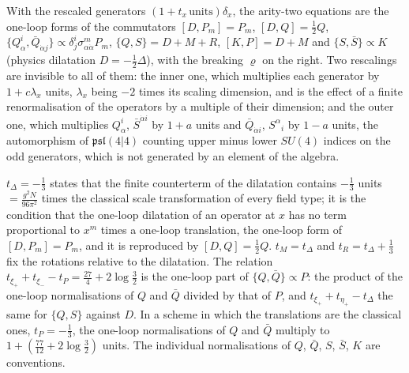 \begin{remark}
With the rescaled generators $(1+t_x\,\text{units})\delta_x$, the arity-two equations are the one-loop forms of the commutators $[D,P_m]=P_m$, $[D,Q]=\tfrac12Q$, $\{Q^i_\alpha,\bar Q_{\dot\alpha j}\}\propto\delta^i_j\sigma^m_{\alpha\dot\alpha}P_m$, $\{Q,S\}=D+M+R$, $[K,P]=D+M$ and $\{S,\bar S\}\propto K$ (physics dilatation $D=-\tfrac12\Delta$), with the breaking $\varrho$ on the right. Two rescalings are invisible to all of them: the inner one, which multiplies each generator by $1+c\lambda_x$ units, $\lambda_x$ being $-2$ times its scaling dimension, and is the effect of a finite renormalisation of the operators by a multiple of their dimension; and the outer one, which multiplies $Q^i_\alpha$, $\bar S^{\dot\alpha i}$ by $1+a$ units and $\bar Q_{\dot\alpha i}$, $S^\alpha{}_i$ by $1-a$ units, the automorphism of $\mathfrak{psl}(4|4)$ counting upper minus lower $SU(4)$ indices on the odd generators, which is not generated by an element of the algebra.
\end{remark}

\begin{remark}
$t_\Delta=-\tfrac13$ states that the finite counterterm of the dilatation contains $-\tfrac13$ units $=\tfrac{g^2N}{96\pi^2}$ times the classical scale transformation of every field type; it is the condition that the one-loop dilatation of an operator at $x$ has no term proportional to $x^m$ times a one-loop translation, the one-loop form of $[D,P_m]=P_m$, and it is reproduced by $[D,Q]=\tfrac12Q$. $t_M=t_\Delta$ and $t_R=t_\Delta+\tfrac13$ fix the rotations relative to the dilatation. The relation $t_{\xi_+}+t_{\xi_-}-t_P=\tfrac{27}4+2\log\tfrac32$ is the one-loop part of $\{Q,\bar Q\}\propto P$: the product of the one-loop normalisations of $Q$ and $\bar Q$ divided by that of $P$, and $t_{\xi_+}+t_{\eta_+}-t_\Delta$ the same for $\{Q,S\}$ against $D$. In a scheme in which the translations are the classical ones, $t_P=-\tfrac13$, the one-loop normalisations of $Q$ and $\bar Q$ multiply to $1+(\tfrac{77}{12}+2\log\tfrac32)$ units. The individual normalisations of $Q$, $\bar Q$, $S$, $\bar S$, $K$ are conventions.
\end{remark}

